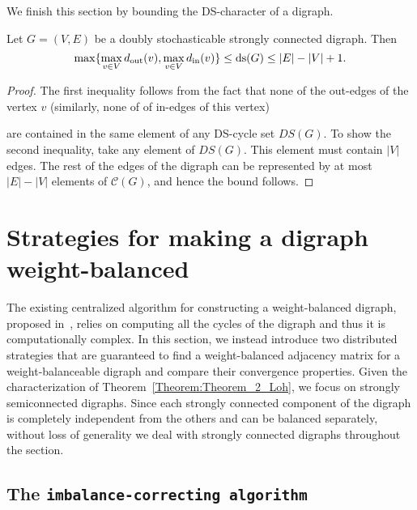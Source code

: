 \documentclass[final]{siamltex}
\begin{document}
We finish this section by bounding the
DS-character of a digraph.

\begin{lemma}\label{lemma:DS_character_bound}
  Let $ G=(V,E) $ be a doubly stochasticable strongly connected
  digraph. Then
  \[
  \max \{\max_{v \in V} {{{d}_{\textup{{out}}}}}(v), \max_{v \in V}
{{{d}_{\textup{{in}}}}}(v)\} \leq {\operatorname{ds}}(G)\leq |E|-|V|+1.
  \]
\end{lemma}\label{lemma:Cstar_bound}
\begin{proof}
  The first inequality follows from the fact that none of the
  out-edges of the vertex $ v $ (similarly, none of of in-edges of
  this vertex)
  
  are contained in the same element of any DS-cycle set $ DS(G)$. To
  show the second inequality, take any element of $ DS(G)$. This
  element must contain $ |V|$ edges.  The rest of the edges of the
  digraph can be represented by at most $ |E|-|V| $ elements of $
  \mathcal{C}(G)$, and hence the bound follows.  \quad
\end{proof}

\section{Strategies for making a digraph
  weight-balanced}\label{section:wb_algos}

The existing centralized algorithm for constructing a weight-balanced
digraph, proposed in~\cite{LHT:70}, relies on computing all the cycles
of the digraph and thus it is computationally complex.  In this
section, we instead introduce two distributed strategies that are
guaranteed to find a weight-balanced adjacency matrix for a
weight-balanceable digraph and compare their convergence properties.
Given the characterization of Theorem~\ref{Theorem:Theorem_2_Loh}, we
focus on strongly semiconnected digraphs. Since each strongly
connected component of the digraph is completely independent from the
others and can be balanced separately, without loss of generality we
deal with strongly connected digraphs throughout the section.

\subsection{The {\texttt{imbalance-correcting algorithm}\xspace}}\label{subsection:wb_dis_algo}
\end{document}
